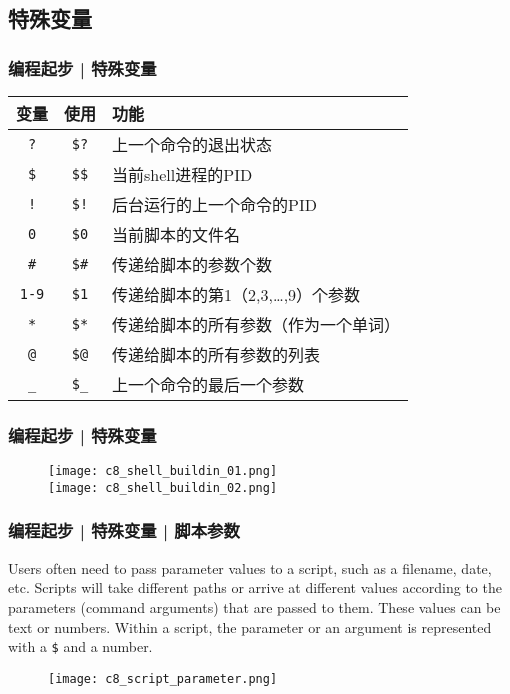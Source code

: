 \subsection{特殊变量}
\begin{frame}[fragile]
  \frametitle{编程起步 | \alert{特殊变量}}
  \begin{table}
    \centering
    \begin{tabularx}{0.8\textwidth}{ccX}
      \hline
      \rowcolor{blue!50}变量 & 使用 & 功能\\
      \hline
      \verb|?| & \verb|$?| & 上一个命令的退出状态\\
      \verb|$| & \verb|$$| & 当前shell进程的PID\\
      \verb|!| & \verb|$!| & 后台运行的上一个命令的PID\\
      \verb|0| & \verb|$0| & 当前脚本的文件名\\
      \verb|#| & \verb|$#| & 传递给脚本的参数个数\\
      \verb|1-9| & \verb|$1| & 传递给脚本的第1（2,3,\ldots,9）个参数\\
      \verb|*| & \verb|$*| & 传递给脚本的所有参数（作为一个单词）\\
      \verb|@| & \verb|$@| & 传递给脚本的所有参数的列表\\
      \verb|_| & \verb|$_| & 上一个命令的最后一个参数\\
      \hline
    \end{tabularx}
  \end{table}
\end{frame}

\begin{frame}
  \frametitle{编程起步 | 特殊变量}
  \begin{figure}
    \centering
    \texttt{[image: c8\_shell\_buildin\_01.png]}\\
    \texttt{[image: c8\_shell\_buildin\_02.png]}
  \end{figure}
\end{frame}

\begin{frame}[fragile]
  \frametitle{编程起步 | 特殊变量 | 脚本参数}
  Users often need to pass parameter values to a script, such as a filename, date, etc. Scripts will take different paths or arrive at different values according to the parameters (command arguments) that are passed to them. These values can be text or numbers. Within a script, the parameter or an argument is represented with a \verb|$| and a number.
  \begin{figure}
    \centering
    \texttt{[image: c8\_script\_parameter.png]}
  \end{figure}
\end{frame}

